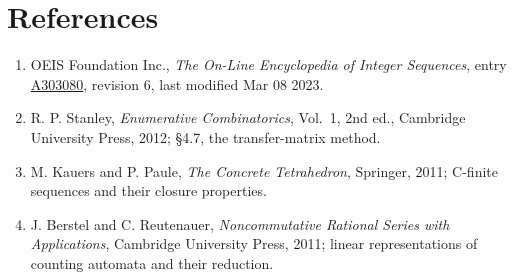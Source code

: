 \documentclass[11pt]{article}
\theoremstyle{definition}
\begin{document}
\section{References}

\begin{enumerate}

\item OEIS Foundation Inc., \emph{The On-Line Encyclopedia of Integer Sequences}, entry \href{https://oeis.org/A303080}{A303080}, revision 6, last modified Mar 08 2023.

\item R. P. Stanley, \emph{Enumerative Combinatorics}, Vol.~1, 2nd ed., Cambridge University Press, 2012; \S4.7, the transfer-matrix method.

\item M. Kauers and P. Paule, \emph{The Concrete Tetrahedron}, Springer, 2011; C-finite sequences and their closure properties.

\item J. Berstel and C. Reutenauer, \emph{Noncommutative Rational Series with Applications}, Cambridge University Press, 2011; linear representations of counting automata and their reduction.

\end{enumerate}
\end{document}
